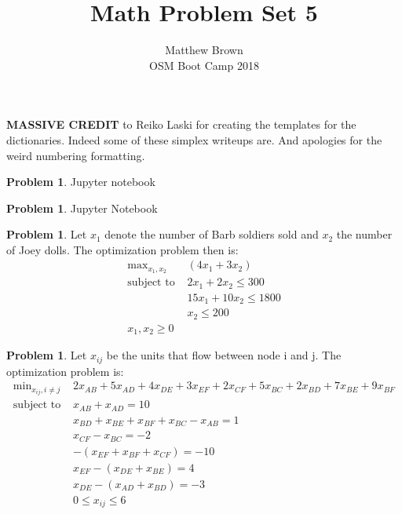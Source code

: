 \documentclass[letterpaper,12pt]{article}
\theoremstyle{definition}
\newtheorem{problem}[theorem]{Problem}
\begin{document}
\title{Math Problem Set 5}
\author{Matthew Brown\\ 
OSM Boot Camp 2018} %
 
\maketitle
\textbf{MASSIVE CREDIT} to Reiko Laski for creating the templates for the dictionaries. Indeed some of these simplex writeups are. And apologies for the weird numbering formatting.
\begin{problem}{8.1}
Jupyter notebook
\end{problem}

\begin{problem}{8.2}
Jupyter Notebook
\end{problem}

\begin{problem}{8.3}
Let $x_1$ denote the number of Barb soldiers sold and $x_2$ the number of Joey dolls. The optimization problem then is:
\begin{align*}
\text{max}_{x_1, x_2} & (4 x_1 + 3 x_2) \\
\text{subject to }
& 2x_1 + 2 x_2 \leq 300 \\
& 15x_1 + 10x_2 \leq 1800 \\
& x_2 \leq 200 \\
x_1, x_2 \geq 0
\end{align*}
\end{problem}

\begin{problem}{8.4}
Let $x_{ij}$ be the units that flow between node i and j. The optimization problem is:
\begin{align*}
\text{min}_{x_{ij}, i \neq j} & 2x_{AB} + 5x_{AD} +4 x_{DE} + 3 x_{EF} + 2 x_{CF} + 5x_{BC} + 2 x_{BD} + 7x_{BE} + 9 x_{BF} \\
\text{subject to }& x_{AB} + x_{AD} = 10\\
& x_{BD} + x_{BE} +x_{BF} + x_{BC} - x_{AB} = 1 \\
& x_{CF} - x_{BC} = -2 \\
& - (x_{EF} + x_{BF} + x_{CF}) = -10 \\
& x_{EF} - (x_{DE} + x_{BE}) = 4 \\
& x_{DE} - (x_{AD} + x_{BD}) = -3 \\
& 0 \leq x_{ij} \leq 6
\end{align*}
\end{problem}
\end{document}
